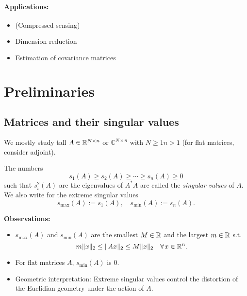 \paragraph{Applications:} \vspace{1pc}
\begin{itemize}[itemsep=0pt]
	\item (Compressed sensing)
	\item Dimension reduction  
	\item Estimation of covariance matrices
\end{itemize}
	
\section{Preliminaries}
\subsection{Matrices and their singular values}
We mostly study tall $A\in \mathbb{R}^{N\times n}$ or $\mathbb{C}^{N\times n}$ with $ N \geq 1 n >1$ (for flat matrices, consider adjoint).
\begin{definition}
\begin{mdframed}
The numbers
\begin{equation*}
s_1(A) \geq s_2(A) \geq \cdots \geq s_n(A) \geq 0
\end{equation*}
such that $s_i^2(A)$ are the eigenvalues of $A^*A$ are called the \emph{singular values} of $A$. We also write for the extreme singular values 
\begin{equation*}
s_{\max}(A) := s_1(A), \quad s_{\min}(A) := s_n(A).
\end{equation*}
\end{mdframed}
\end{definition}
\textbf{Observations:}\vspace{-0.5pc}
\begin{itemize}[itemsep=0pt]
	\item $s_{\max}(A)$ and $s_{\min}(A)$ are the smallest $M\in\mathbb{R}$ and the largest $m\in \mathbb{R}$ s.t.
	\begin{equation*}
		m\|x\|_2 \leq \|Ax\|_2 \leq M\|x\|_2 \quad \forall x\in\R^n.
	\end{equation*}
	\item For flat matrices $A$, $s_{\min}(A)$ is 0.
	\item Geometric interpretation: Extreme singular values control the distortion of the Euclidian geometry under the action of $A$.
\end{itemize}
